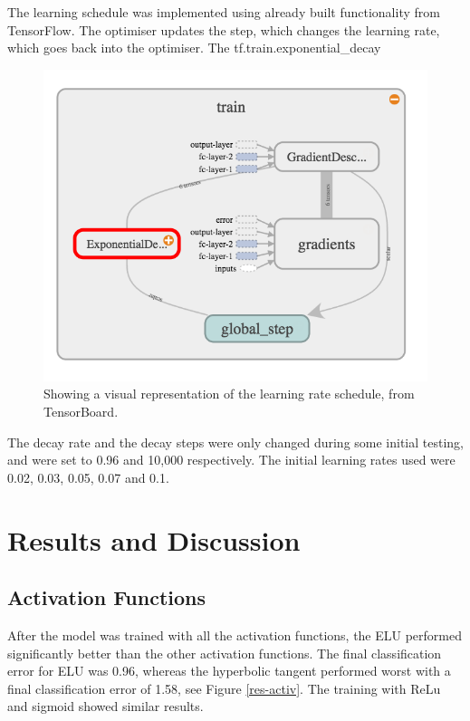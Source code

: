 \documentclass[]{article}
\begin{document}
The learning schedule was implemented using already built functionality from TensorFlow. The optimiser updates the step, which changes the learning rate, which goes back into the optimiser.  The tf.train.exponential\_decay

\begin{figure}[h]
	\includegraphics[width=\textwidth]{model_2}
	\caption{Showing a visual representation of the learning rate schedule, from TensorBoard.}
	\label{model_2}
	\centering
\end{figure}

The decay rate and the decay steps were only changed during some initial testing, and were set to 0.96 and 10,000 respectively. The initial learning rates used were 0.02, 0.03, 0.05, 0.07 and 0.1. 

\section{Results and Discussion}

\subsection{Activation Functions}

After the model was trained with all the activation functions, the ELU performed significantly better than the other activation functions. The final classification error for ELU was 0.96, whereas the hyperbolic tangent performed worst with a final classification error of 1.58, see Figure \ref{res-activ}. The training with ReLu and sigmoid showed similar results. 
\end{document}
